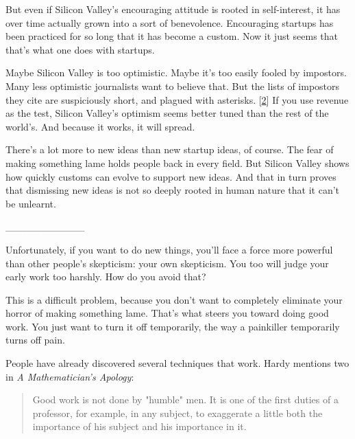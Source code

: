 But even if Silicon
                  Valley's encouraging attitude is rooted in self-interest, it
                  has over time actually grown into a sort of benevolence.
                  Encouraging startups has been practiced for so long that it
                  has become a custom. Now it just seems that that's what one
                  does with startups.

Maybe Silicon Valley is too
                  optimistic. Maybe it's too easily fooled by impostors. Many
                  less optimistic journalists want to believe that. But the
                  lists of impostors they cite are suspiciously short, and
                  plagued with asterisks.
                  [\href{\#f2n}{2}]
                  If you use revenue as the test, Silicon Valley's optimism
                  seems better tuned than the rest of the world's. And because
                  it works, it will spread.

There's a lot more to new
                  ideas than new startup ideas, of course. The fear of making
                  something lame holds people back in every field. But Silicon
                  Valley shows how quickly customs can evolve to support new
                  ideas. And that in turn proves that dismissing new ideas is
                  not so deeply rooted in human nature that it can't be
                  unlearnt.


                  \_\_\_\_\_\_\_\_\_\_\_
                  


                  Unfortunately, if you want to do new things, you'll face a
                  force more powerful than other people's skepticism: your own
                  skepticism. You too will judge your early work too harshly.
                  How do you avoid that?

This is a difficult problem,
                  because you don't want to completely eliminate your horror of
                  making something lame. That's what steers you toward doing
                  good work. You just want to turn it off temporarily, the way a
                  painkiller temporarily turns off pain.

People have
                  already discovered several techniques that work. Hardy
                  mentions two in \emph{A Mathematician's Apology}:
                  \begin{quote}

                    Good work is not done by "humble" men. It is one of the
                    first duties of a professor, for example, in any subject, to
                    exaggerate a little both the importance of his subject and
                    his importance in it.
                  
\end{quote}

